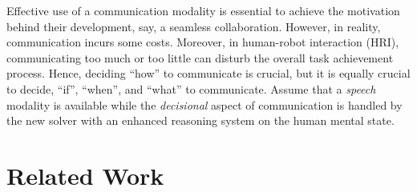 \documentclass[letterpaper]{article} %
\begin{document}

Effective use of a communication modality is essential to achieve the motivation behind their development, say, a seamless collaboration. However, in reality, communication incurs some costs. 
Moreover, in human-robot interaction (HRI), communicating too much or too little can disturb the overall task achievement process. 
Hence, deciding ``how'' to communicate is crucial, but it is equally crucial to decide, ``if'', ``when'', and ``what'' to communicate. 
Assume that a \textit{speech} modality is available while the 
\textit{decisional} aspect of communication is handled by the new solver with an enhanced reasoning system on the human mental state.
%


\section{Related Work}
\end{document}
